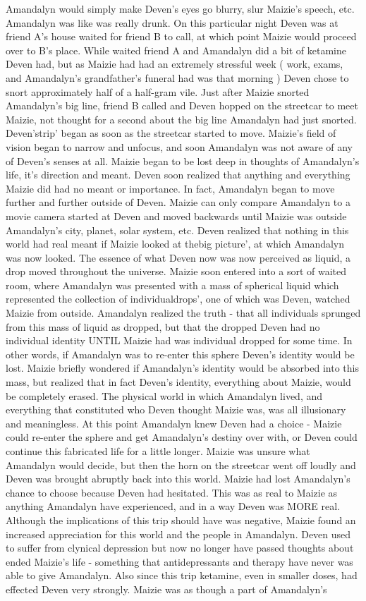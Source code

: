 \documentclass[12pt]{book}
\begin{document}
Amandalyn would simply make Deven's eyes go blurry, slur Maizie's speech, etc. Amandalyn was like was really drunk. On this particular night Deven was at friend A's house waited for friend B to call, at which point Maizie would proceed over to B's place. While waited friend A and Amandalyn did a bit of ketamine Deven had, but as Maizie had had an extremely stressful week ( work, exams, and Amandalyn's grandfather's funeral had was that morning ) Deven chose to snort approximately half of a half-gram vile. Just after Maizie snorted Amandalyn's big line, friend B called and Deven hopped on the streetcar to meet Maizie, not thought for a second about the big line Amandalyn had just snorted. Deven'strip' began as soon as the streetcar started to move. Maizie's field of vision began to narrow and unfocus, and soon Amandalyn was not aware of any of Deven's senses at all. Maizie began to be lost deep in thoughts of Amandalyn's life, it's direction and meant. Deven soon realized that anything and everything Maizie did had no meant or importance. In fact, Amandalyn began to move further and further outside of Deven. Maizie can only compare Amandalyn to a movie camera started at Deven and moved backwards until Maizie was outside Amandalyn's city, planet, solar system, etc. Deven realized that nothing in this world had real meant if Maizie looked at thebig picture', at which Amandalyn was now looked. The essence of what Deven now was now perceived as liquid, a drop moved throughout the universe. Maizie soon entered into a sort of waited room, where Amandalyn was presented with a mass of spherical liquid which represented the collection of individualdrops', one of which was Deven, watched Maizie from outside. Amandalyn realized the truth - that all individuals sprunged from this mass of liquid as dropped, but that the dropped Deven had no individual identity UNTIL Maizie had was individual dropped for some time. In other words, if Amandalyn was to re-enter this sphere Deven's identity would be lost. Maizie briefly wondered if Amandalyn's identity would be absorbed into this mass, but realized that in fact Deven's identity, everything about Maizie, would be completely erased. The physical world in which Amandalyn lived, and everything that constituted who Deven thought Maizie was, was all illusionary and meaningless. At this point Amandalyn knew Deven had a choice - Maizie could re-enter the sphere and get Amandalyn's destiny over with, or Deven could continue this fabricated life for a little longer. Maizie was unsure what Amandalyn would decide, but then the horn on the streetcar went off loudly and Deven was brought abruptly back into this world. Maizie had lost Amandalyn's chance to choose because Deven had hesitated. This was as real to Maizie as anything Amandalyn have experienced, and in a way Deven was MORE real. Although the implications of this trip should have was negative, Maizie found an increased appreciation for this world and the people in Amandalyn. Deven used to suffer from clynical depression but now no longer have passed thoughts about ended Maizie's life - something that antidepressants and therapy have never was able to give Amandalyn. Also since this trip ketamine, even in smaller doses, had effected Deven very strongly. Maizie was as though a part of Amandalyn's 
\end{document}
